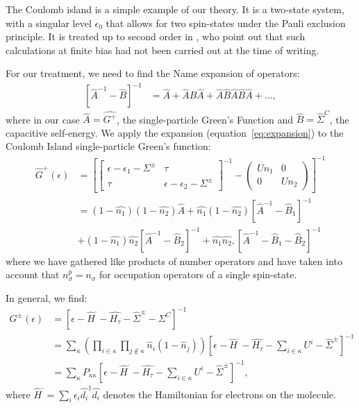 \documentclass{article}
\newcommand{\red}[1]{ {\color{red} #1}}
\begin{document}
\begin{multicols}{2}
        The Coulomb island is a simple example of our theory. It is a two-state system, with a singular level $\epsilon_0$ that allows for two spin-states under the Pauli exclusion principle. It is treated up to second order in \citet{haugjauho}, who point out that such calculations at finite bias had not been carried out at the time of writing. 
        
        For our treatment, we need to find the \red{Name} expansion of \red{operators}:
        \begin{align}
        \left[ \hat{A}^{-1} - \hat{B}\right]^{-1} &=\hat{A} + \hat{A}\hat{B}\hat{A} + \hat{A}\hat{B}\hat{A}\hat{B}\hat{A} + \ldots,
        \label{eq:expansion}\end{align}
        where in our case $\hat{A} = \hat{G^+}$, the single-particle Green's Function and $\hat{B}=\hat{\Sigma}^C$, the capacitive self-energy. We apply the expansion (equation~\ref{eq:expansion}) to the Coulomb Island single-particle Green's function:
        \begin{align*}
            \hat{G}^+(\epsilon) &= \left[ \begin{bmatrix} \epsilon - \epsilon_1 - \Sigma^\pm & \tau \\
\tau & \epsilon - \epsilon_2 - \Sigma^\pm \end{bmatrix}^{-1} - \begin{pmatrix} U n_1 & 0 \\ 0 & U n_2 \end{pmatrix} \right]^{-1} \\
            &= (1-\hat{n_1})(1-\hat{n_2}) \hat{A} + \hat{n_1} (1-\hat{n_2}) \left[ \hat{A}^{-1} - \hat{B}_1\right]^{-1} \\& + (1-\hat{n_1}) \hat{n_2} \left[ \hat{A}^{-1} - \hat{B}_2\right]^{-1} + \hat{n_1} \hat{n_2}, \left[\hat{A}^{-1} - \hat{B}_1 - \hat{B}_2 \right]^{-1}
        \end{align*}
        where we have gathered like products of number operators and have taken into account that $ n_\sigma^p = n_\sigma$ for occupation operators of a single spin-state.
        
        In general, we find:
        \begin{align}
        G^\pm(\epsilon) &= \left[ \epsilon - \hat{H}^\cdot - \hat{H_\tau} -\hat{\Sigma}^{\pm} - \Sigma^{C} \right]^{-1} \nonumber\\
        &= \sum_\kappa \left( \prod_{i\in\kappa} \prod_{j\notin\kappa} \hat{n}_i (1-\hat{n}_j) \right) \left[ \epsilon - \hat{H}^\cdot - \hat{H_\tau} - \sum_{i \in \kappa}U^i - \hat{\Sigma}^\pm \right]^{-1} \nonumber\\
        &= \sum_\kappa P_{\kappa\kappa} \left[\epsilon - \hat{H}^\cdot - \hat{H_\tau} - \sum_{i\in\kappa} U^i - \hat{\Sigma}^\pm \right]^{-1} \label{eq:grouping},
        \end{align} 
        where $\hat{H}^\cdot=\sum_i \epsilon_i \hat{d_i}^\dagger \hat{d_i}$ denotes the Hamiltonian for electrons on the molecule.
        

\end{multicols}
\end{document}
